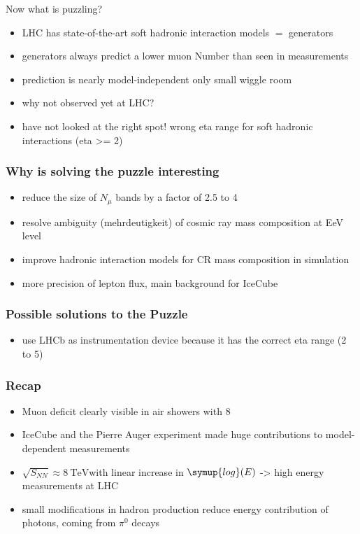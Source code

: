 \documentclass[aspectratio=1610, 9pt]{beamer}
\begin{document}
\begin{frame}{Now what is puzzling?}
  \begin{itemize}
    \item LHC has state-of-the-art soft hadronic interaction models $=$ generators
    \item generators always predict a lower muon Number than seen in measurements
    \item prediction is nearly model-independent \to only small wiggle room
    \item why not observed yet at LHC?
    \item have not looked at the right spot! wrong eta range for soft hadronic interactions (eta >= 2)
  \end{itemize}
\end{frame}


\begin{frame}\frametitle{Why is solving the puzzle interesting}
  \begin{itemize}
    \item reduce the size of $N_\mu$ bands by a factor of 2.5 to 4
    \item resolve ambiguity (mehrdeutigkeit) of cosmic ray mass composition at EeV level
    \item improve hadronic interaction models for CR mass composition in simulation
    \item more precision of lepton flux, main background for IceCube
  \end{itemize}
\end{frame}

\begin{frame}\frametitle{Possible solutions to the Puzzle}
  \begin{itemize}
    \item use LHCb as instrumentation device because it has the correct eta range (2 to 5)
  \end{itemize}
\end{frame}

\begin{frame}\frametitle{Recap}
  \begin{itemize}
    \item Muon deficit clearly visible in air showers with 8\sigma
    \item IceCube and the Pierre Auger experiment made huge contributions to model-dependent measurements
    \item $\sqrt{S_{NN}} \approx \SI{8}{\tera\electronvolt}$with linear increase in $\symup{log}(E)$ -> high energy measurements at LHC
    \item small modifications in hadron production reduce energy contribution of photons, coming from $\pi^{0}$ decays
  \end{itemize}
\end{frame}
\end{document}
